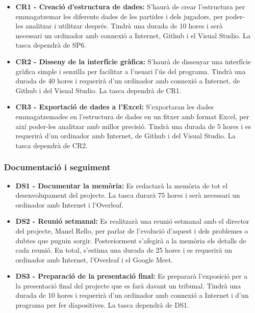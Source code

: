 \documentclass[a4paper]{article}
\begin{document}
\begin{itemize}
    \item \textbf{CR1 - Creació d'estructura de dades:} S'haurà de crear l'estructura per emmagatzemar les diferents dades de les partides i dels jugadors, per poder-les analitzar i utilitzar després. Tindrà una durada de 10 hores i serà necessari un ordinador amb connexió a Internet, Github i el Visual Studio. La tasca dependrà de SP6.
    \item \textbf{CR2 - Disseny de la interfície gràfica:} S'haurà de dissenyar una interfície gràfica simple i senzilla per facilitar a l'usuari l'ús del programa. Tindrà una durada de 40 hores i requerirà d'un ordinador amb connexió a Internet, de Github i del Visual Studio. La tasca dependrà de CR1. 
    \item \textbf{CR3 - Exportació de dades a l'Excel:} S'exportaran les dades emmagatzemades en l'estructura de dades en un fitxer amb format Excel, per així poder-les analitzar amb millor precisió. Tindrà una durada de 5 hores i es requerirà d'un ordinador amb Internet, de Github i del Visual Studio. La tasca dependrà de CR2.
\end{itemize}

\subsubsection{Documentació i seguiment}
\begin{itemize}
    \item \textbf{DS1 - Documentar la memòria:} Es redactarà la memòria de tot el desenvolupament del projecte. La tasca durarà 75 hores i serà necessari un ordinador amb Internet i l'Overleaf.
    \item \textbf{DS2 - Reunió setmanal:} Es realitzarà una reunió setmanal amb el director del projecte, Manel Rello, per parlar de l'evolució d'aquest i dels problemes o dubtes que puguin sorgir. Posteriorment s'afegirà a la memòria els detalls de cada reunió. En total, s'estima una durada de 25 hores i es requerirà un ordinador amb Internet, l'Overleaf i el Google Meet.
    \item \textbf{DS3 - Preparació de la presentació final:} Es prepararà l'exposició per a la presentació final del projecte que es farà davant un tribunal. Tindrà una durada de 10 hores i requerirà d'un ordinador amb connexió a Internet i d'un programa per fer diapositives. La tasca dependrà de DS1. 
\end{itemize}

\newpage
\end{document}
